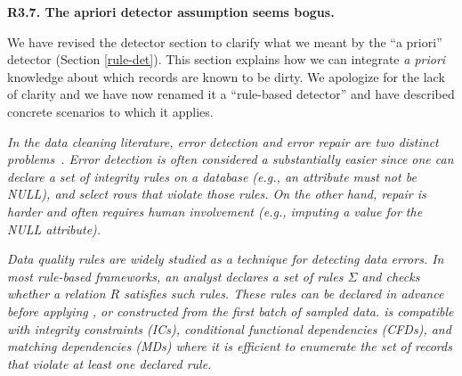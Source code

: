 \vspace{0.5em}

\noindent\textbf{R3.7. The apriori detector assumption seems bogus.} 

\noindent  We have revised the detector section to clarify what we meant by the ``a priori'' detector (Section \ref{rule-det}). This section explains how we can integrate \emph{a priori} knowledge about which records are known to be dirty. We apologize for the lack of clarity and we have now renamed it a ``rule-based detector'' and have described concrete scenarios to which it applies. 

\vspace{0.5em}

\emph{In the data cleaning literature, error detection and error repair are two distinct problems~\cite{DBLP:series/synthesis/2012Fan, Dasu:2003:EDM:861869, rahm2000data}.
Error detection is often considered a substantially easier since one can declare a set of integrity rules on a database (e.g., an attribute must not be NULL), and select rows that violate those rules.
On the other hand, repair is harder and often requires human involvement (e.g., imputing a value for the NULL attribute).}

\vspace{0.5em}

\emph{Data quality rules are widely studied as a technique for detecting data errors.
In most rule-based frameworks, an analyst declares a set of rules $\Sigma$ and checks whether a relation $R$ satisfies such rules.
These rules can be declared in advance before applying \sys, or constructed from the first batch of sampled data.
\sys is compatible with integrity constraints (ICs), conditional functional dependencies (CFDs), and matching dependencies (MDs) where it is efficient to enumerate the set of records that violate at least one declared rule. }